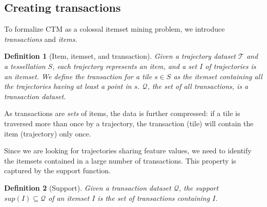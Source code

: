 \documentclass[
]{ceurart}
\newtheorem{example}{Example}
\newtheorem{definition}{Definition}
\begin{document}


\subsection{Creating transactions}

To formalize CTM as a colossal itemset mining problem, we introduce \textit{transactions} and \textit{items}.

\begin{definition}[Item, itemset, and transaction] Given a trajectory dataset $\mathcal{T}$ and a tessellation $S$, each trajectory represents an \textit{item}, and a set $I$ of trajectories is an \textit{itemset}.
We define the \textit{transaction} for a tile $s \in S$ as the itemset containing all the trajectories having at least a point in $s$.
$\mathcal{Q}$, the set of all transactions, is a transaction dataset.
\end{definition}

As transactions are \textit{sets} of items, the data is further compressed: if a tile is traversed more than once by a trajectory, the transaction (tile) will contain the item (trajectory) only once.

Since we are looking for trajectories sharing feature values, we need to identify the itemsets contained in a large number of transactions. 
This property is captured by the support function.

\begin{definition}[Support]
Given a transaction dataset $\mathcal{Q}$, the \textit{support} $sup(I)\subseteq\mathcal{Q}$ of an itemset $I$ is the set of transactions containing $I$.
\end{definition}

\end{document}

